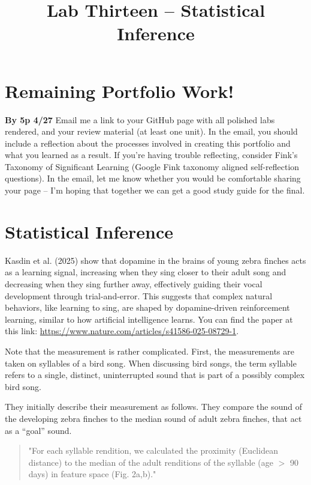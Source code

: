 \documentclass[
]{article}
\title{Lab Thirteen -- Statistical Inference}
\author{}
\date{}
\begin{document}
\maketitle


\normalsize

\normalsize

\section{Remaining Portfolio Work!}\label{remaining-portfolio-work}

\textbf{By 5p 4/27} Email me a link to your GitHub page with all
polished labs rendered, and your review material (at least one unit). In
the email, you should include a reflection about the processes involved
in creating this portfolio and what you learned as a result. If you're
having trouble reflecting, consider Fink's Taxonomy of Significant
Learning (Google Fink taxonomy aligned self-reflection questions). In
the email, let me know whether you would be comfortable sharing your
page -- I'm hoping that together we can get a good study guide for the
final.

\section{Statistical Inference}\label{statistical-inference}

Kasdin et al. (2025) show that dopamine in the brains of young zebra
finches acts as a learning signal, increasing when they sing closer to
their adult song and decreasing when they sing further away, effectively
guiding their vocal development through trial-and-error. This suggests
that complex natural behaviors, like learning to sing, are shaped by
dopamine-driven reinforcement learning, similar to how artificial
intelligence learns. You can find the paper at this link:
\url{https://www.nature.com/articles/s41586-025-08729-1}.

Note that the measurement is rather complicated. First, the measurements
are taken on syllables of a bird song. When discussing bird songs, the
term syllable refers to a single, distinct, uninterrupted sound that is
part of a possibly complex bird song.

They initially describe their measurement as follows. They compare the
sound of the developing zebra finches to the median sound of adult zebra
finches, that act as a ``goal'' sound.

\begin{quote}
"For each syllable rendition, we calculated the proximity (Euclidean distance) to the median of the adult renditions of the syllable (age $>$ 90 days) in feature space (Fig. 2a,b)."
\end{quote}
\end{document}
